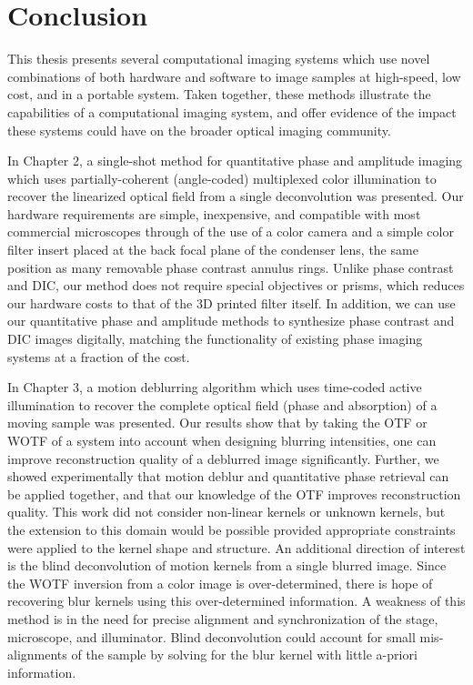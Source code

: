 \chapter{Conclusion}
This thesis presents several computational imaging systems which use novel combinations of both hardware and software to image samples at high-speed, low cost, and in a portable system. Taken together, these methods illustrate the capabilities of a computational imaging system, and offer evidence of the impact these systems could have on the broader optical imaging community.

In Chapter 2, a single-shot method for quantitative phase and amplitude imaging which uses partially-coherent (angle-coded) multiplexed color illumination to recover the linearized optical field from a single deconvolution was presented. Our hardware requirements are simple, inexpensive, and compatible with most commercial microscopes through of the use of a color camera and a simple color filter insert placed at the back focal plane of the condenser lens, the same position as many removable phase contrast annulus rings. Unlike phase contrast and DIC, our method does not require special objectives or prisms, which reduces our hardware costs to that of the 3D printed filter itself. In addition, we can use our quantitative phase and amplitude methods to synthesize phase contrast and DIC images digitally, matching the functionality of existing phase imaging systems at a fraction of the cost.

In Chapter 3, a motion deblurring algorithm which uses time-coded active illumination to recover the complete optical field (phase and absorption) of a moving sample was presented. Our results show that by taking the OTF or WOTF of a system into account when designing blurring intensities, one can improve reconstruction quality of a deblurred image significantly. Further, we showed experimentally that motion deblur and quantitative phase retrieval can be applied together, and that our knowledge of the OTF improves reconstruction quality. This work did not consider non-linear kernels or unknown kernels, but the extension to this domain would be possible provided appropriate constraints were applied to the kernel shape and structure. An additional direction of interest is the blind deconvolution of motion kernels from a single blurred image. Since the WOTF inversion from a color image is over-determined, there is hope of recovering blur kernels using this over-determined information. A weakness of this method is in the need for precise alignment and synchronization of the stage, microscope, and illuminator. Blind deconvolution could account for small mis-alignments of the sample by solving for the blur kernel with little a-priori information.

